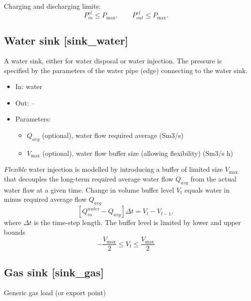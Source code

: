 \documentclass[12pt]{article}
\begin{document}
Charging and discharging limits:
 \begin{equation}
 P_{in}^{el} \leq P_{\max } , \qquad
 P_{out}^{el} \leq P_{\max } .
 \end{equation}





\subsection{Water sink [sink\_water]}

A  water sink, either for water disposal or water injection. The pressure is specified by the parameters of the water pipe (edge) connecting to the water sink.

\begin{itemize}
\item In: water
\item Out: --
\item Parameters:
\begin{itemize}[noitemsep,topsep=0pt]
	\item $Q_{avg}$  (optional), water flow required average (Sm3/s)
	\item $V_{\max }$ (optional),  water flow buffer size (allowing flexibility) (Sm3/s h) 
\end{itemize}
\end{itemize}

\medskip\noindent
\textit{Flexible} water injection is modelled by introducing a buffer of limited size $V_{\max }$ that decouples the long-term required average water flow  $Q_{avg}$ from the actual water flaw at a given time.
%
Change in volume buffer level  $V_{t}$  equals water in minus required average flow  \( Q_{avg} \) 
 \begin{equation}
 	\left[ Q_{in}^{water}-Q_{avg} \right]  \Delta t=V_{t}-V_{t-1}, 
 \end{equation}
where  $\Delta t$ is the time-step length.
%
The buffer level is limited by lower and upper bounds
 \begin{equation}
	 -\frac{V_{\max }}{2} \leq V_{t} \leq \frac{V_{\max }}{2} 
 \end{equation}





\subsection{Gas sink [sink\_gas]}
Generic gas load (or export point)
\end{document}
